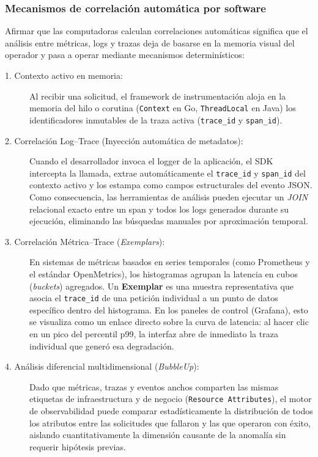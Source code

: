 \documentclass[variant=apuntes,cover=institutional,mode=screen]{ua-engineering-v6-article}
\begin{document}
\subsubsection{Mecanismos de correlación automática por software}

Afirmar que las computadoras calculan correlaciones automáticas significa que el análisis entre métricas, logs y trazas deja de basarse en la memoria visual del operador y pasa a operar mediante mecanismos determinísticos:

\begin{description}
\item[1. Contexto activo en memoria:] Al recibir una solicitud, el framework de instrumentación aloja en la memoria del hilo o corutina (\texttt{Context} en Go, \texttt{ThreadLocal} en Java) los identificadores inmutables de la traza activa (\texttt{trace\_id} y \texttt{span\_id}).
\item[2. Correlación Log--Trace (Inyección automática de metadatos):] Cuando el desarrollador invoca el logger de la aplicación, el SDK intercepta la llamada, extrae automáticamente el \texttt{trace\_id} y \texttt{span\_id} del contexto activo y los estampa como campos estructurales del evento JSON. Como consecuencia, las herramientas de análisis pueden ejecutar un \emph{JOIN} relacional exacto entre un span y todos los logs generados durante su ejecución, eliminando las búsquedas manuales por aproximación temporal.
\item[3. Correlación Métrica--Trace (\emph{Exemplars}):] En sistemas de métricas basados en series temporales (como Prometheus y el estándar OpenMetrics), los histogramas agrupan la latencia en cubos (\emph{buckets}) agregados. Un \textbf{Exemplar} es una muestra representativa que asocia el \texttt{trace\_id} de una petición individual a un punto de datos específico dentro del histograma. En los paneles de control (Grafana), esto se visualiza como un enlace directo sobre la curva de latencia: al hacer clic en un pico del percentil p99, la interfaz abre de inmediato la traza individual que generó esa degradación.
\item[4. Análisis diferencial multidimensional (\emph{BubbleUp}):] Dado que métricas, trazas y eventos anchos comparten las mismas etiquetas de infraestructura y de negocio (\texttt{Resource Attributes}), el motor de observabilidad puede comparar estadísticamente la distribución de todos los atributos entre las solicitudes que fallaron y las que operaron con éxito, aislando cuantitativamente la dimensión causante de la anomalía sin requerir hipótesis previas.
\end{description}
\end{document}
